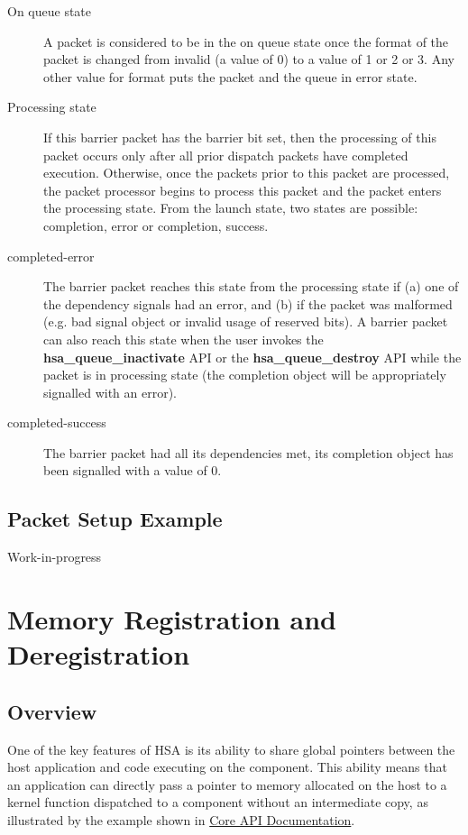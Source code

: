 \documentclass{book}
\newcommand{\reffun}[1]{\textbf{#1}}
\begin{document}
\begin{description}
\item[On queue state] A packet is considered to be in the on queue
state once the format of the packet is changed from invalid (a value
of 0) to a value of 1 or 2 or 3. Any other value for format puts the
packet and the queue in error state.
\item[Processing state] If this barrier packet has the barrier bit set,
then the processing of this packet occurs only after all prior
dispatch packets have completed execution.  Otherwise, once the
packets prior to this packet are processed, the packet processor
begins to process this packet and the packet enters the processing
state.  From the launch state, two states are possible: completion,
error or completion, success.
\item[completed-error] The barrier packet reaches this state from
the processing state if (a) one of the dependency signals had an
error, and (b) if the packet was malformed (e.g. bad signal object
or invalid usage of reserved bits). A barrier packet can also reach
this state when the user invokes the \reffun{hsa\_queue\_inactivate}
API or the \reffun{hsa\_queue\_destroy} API while the packet is in
processing state (the completion object will be appropriately
signalled with an error).
\item[completed-success] The barrier packet had all its dependencies
met, its completion object has been signalled with a value of 0.
\end{description}

\hypertarget{aql_example}{}\subsection{Packet Setup
Example}\label{aql_example}
{\color{red} Work-in-progress}


\hypertarget{coreapi_memory_registration}{}\section{Memory Registration and Deregistration}\label{coreapi_memory_registration}
\hypertarget{coreapi_registration_overview}{}\subsection{Overview}\label{coreapi_registration_overview}
One of the key features of HSA is its ability to share global
pointers between the host application and code executing on the
component. This ability means that an application can directly pass a
pointer to memory allocated on the host to a kernel function
dispatched to a component without an intermediate copy, as illustrated
by the example shown in \hyperlink{coreapi}{Core API
Documentation}.
\end{document}
